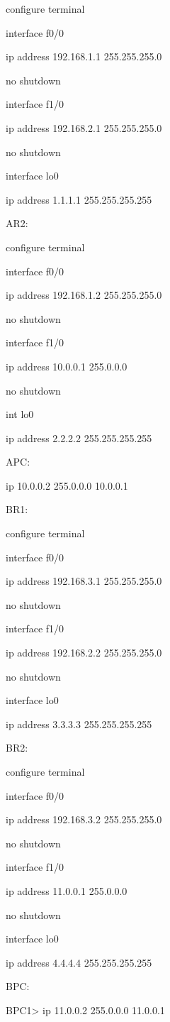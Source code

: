 \documentclass[12pt]{article}
\begin{document}
configure terminal

interface f0/0

ip address 192.168.1.1 255.255.255.0

no shutdown

interface f1/0

ip address 192.168.2.1 255.255.255.0

no shutdown

interface lo0

ip address 1.1.1.1 255.255.255.255


\noindent AR2:

configure terminal

interface f0/0

ip address 192.168.1.2 255.255.255.0

no shutdown

interface f1/0

ip address 10.0.0.1 255.0.0.0

no shutdown

int lo0

ip address 2.2.2.2 255.255.255.255

\noindent APC:

ip 10.0.0.2 255.0.0.0 10.0.0.1

\noindent BR1:

configure terminal

interface f0/0

ip address 192.168.3.1 255.255.255.0

no shutdown

interface f1/0

ip address 192.168.2.2 255.255.255.0

no shutdown

interface lo0

ip address 3.3.3.3 255.255.255.255

\noindent BR2:

configure terminal

interface f0/0

ip address 192.168.3.2 255.255.255.0

no shutdown

interface f1/0

ip address 11.0.0.1 255.0.0.0

no shutdown

interface lo0

ip address 4.4.4.4 255.255.255.255

\noindent BPC:

BPC1> ip 11.0.0.2 255.0.0.0 11.0.0.1
\end{document}
